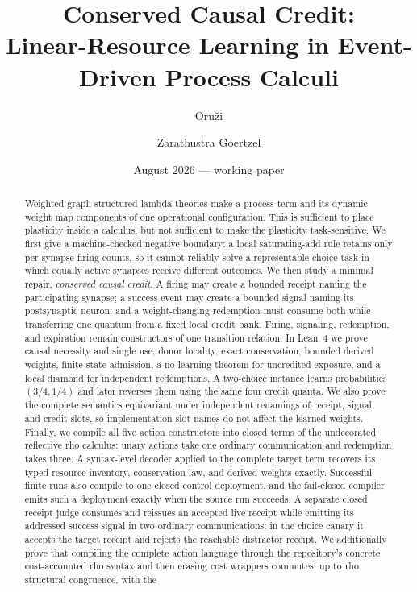 \documentclass[11pt]{article}
\title{Conserved Causal Credit:\\
Linear-Resource Learning in Event-Driven Process Calculi}
\author{Oru\v{z}i \and Zarathustra Goertzel}
\date{August 2026 --- working paper}
\begin{document}
\maketitle

\begin{abstract}
Weighted graph-structured lambda theories make a process term and its dynamic
weight map components of one operational configuration.  This is sufficient
to place plasticity inside a calculus, but not sufficient to make the
plasticity task-sensitive.  We first give a machine-checked negative boundary:
a local saturating-add rule retains only per-synapse firing counts, so it
cannot reliably solve a representable choice task in which equally active
synapses receive different outcomes.  We then study a minimal repair,
\emph{conserved causal credit}.  A firing may create a bounded receipt naming
the participating synapse; a success event may create a bounded signal naming
its postsynaptic neuron; and a weight-changing redemption must consume both
while transferring one quantum from a fixed local credit bank.  Firing,
signaling, redemption, and expiration remain constructors of one transition
relation.  In Lean~4 we prove causal necessity and single use, donor locality,
exact conservation, bounded derived weights, finite-state admission, a
no-learning theorem for uncredited exposure, and a local diamond for
independent redemptions.  A two-choice instance learns probabilities
$(3/4,1/4)$ and later reverses them using the same four credit quanta.  We also
prove the complete semantics equivariant under independent renamings of
receipt, signal, and credit slots, so implementation slot names do not affect
the learned weights.  Finally, we compile all five action constructors into
closed terms of the undecorated reflective rho calculus: unary actions take
one ordinary communication and redemption takes three.  A syntax-level
decoder applied to the complete target term recovers its typed resource
inventory, conservation law, and derived weights exactly.  Successful finite runs
also compile to one closed control deployment, and the fail-closed compiler
emits such a deployment exactly when the source run succeeds.  A separate
closed receipt judge consumes and reissues an accepted live receipt while
emitting its addressed success signal in two ordinary communications; in the
choice canary it accepts the target receipt and rejects the reachable
distractor receipt.  We additionally prove that compiling the complete action
language through the repository's concrete cost-accounted rho syntax and then
erasing cost wrappers commutes, up to rho structural congruence, with the

\end{abstract}
\end{document}
